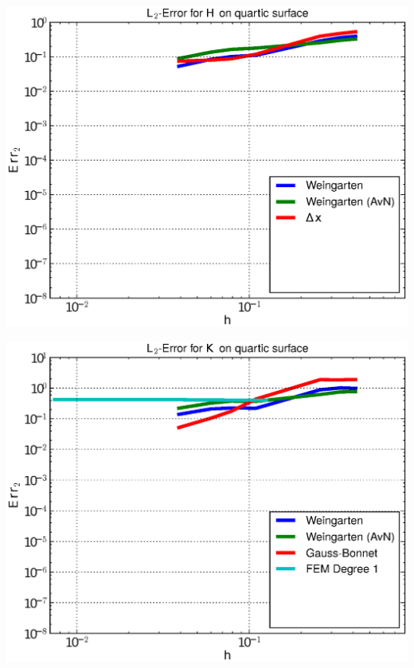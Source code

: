 \documentclass[handout]{beamer}
\begin{document}
\begin{frame}
\begin{overprint}
\begin{minipage}[t]{0.49\textwidth}
            \centering\includegraphics[width=\textwidth]{bilder/Curvature/heineB/ErrHL2_3.eps}
          \end{minipage}
          \begin{minipage}[t]{0.49\textwidth}
            \centering\includegraphics[width=\textwidth]{bilder/Curvature/heineB/ErrKL2_4.eps}
          \end{minipage}\hfill
          \begin{minipage}[t]{0.49\textwidth}

\end{minipage}
\end{overprint}
\end{frame}
\end{document}
